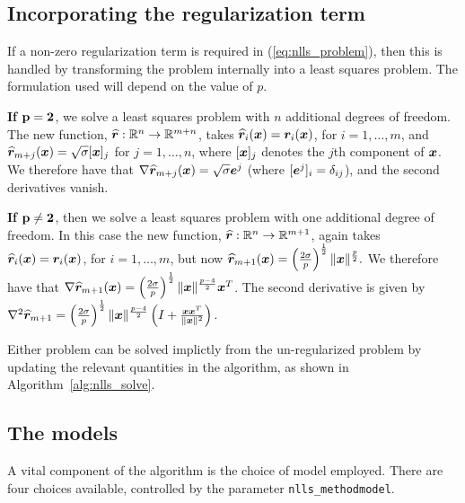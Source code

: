 \subsection{Incorporating the regularization term}
\label{sec:reg_problem}

If a non-zero regularization term is required in (\ref{eq:nlls_problem}), then this is handled by transforming the problem internally into a least squares problem.  The
formulation used will depend on the value of $p$.

{\bf If $\bf p = 2$}, we solve a least squares problem with $n$ additional degrees of freedom.
The new function, $\widehat{{\bm r}} : \mathbb{R}^{n}\rightarrow\mathbb{R}^{m+n}$, takes $\widehat{{\bm r}}_i({\bm x}) = {\bm r}_i({\bm x})$, for $i = 1,\dots, m$, and $\widehat{{\bm r}}_{m+j}({\bm x}) =
\sqrt{\sigma}[{\bm x}]_j$ for $j = 1,\dots, n$, where $[{\bm x}]_j$ denotes the $j$th component of ${\bm x}$.  We therefore have that $\nabla \widehat{{\bm r}}_{m+j}({\bm x}) = \sqrt{\sigma}{\bm e}^j$ (where $[{\bm e}^j]_i = \delta_{ij}$), and the second derivatives vanish.

{\bf If $\bf p \ne 2$}, then we solve a least squares problem
 with one additional degree of freedom.  In this case the new function, $\widehat{{\bm r}} : \mathbb{R}^{n}\rightarrow\mathbb{R}^{m+1}$, again takes $\widehat{{\bm r}}_i({\bm x}) = {\bm r}_i({\bm x})$, for $i = 1,\dots, m$, but now $\widehat{{\bm r}}_{m+1}({\bm x}) = \left(\frac{2\sigma}{p}\right)^{\frac{1}{2}}\|{\bm x}\|^{\frac{p}{2}}.$  We therefore have that
$\nabla \widehat{{\bm r}}_{m+1}({\bm x}) = \left(\frac{2\sigma}{p}\right)^{\frac{1}{2}}\|{\bm x}\|^{\frac{p-4}{2}}{\bm x}^T$.
The second derivative is given by %
\(
\nabla^2\widehat{\vr}_{m+1} =
   \left(\frac{2\sigma}{p}\right)^{\frac{1}{2}}\|\vx\|^{\frac{p-4}{2}}\left(I + \frac{\vx\vx^T}{\|\vx\|^2}\right).%
\)


Either problem can be solved implictly from the un-regularized problem by updating the relevant quantities in the algorithm, as shown in Algorithm~\ref{alg:nlls_solve}.

\subsection{The models}
\label{sec:model_description}

A vital component of the algorithm is the choice of model employed.  There are four choices
available, controlled by the parameter {\tt  nlls\_method\ct model}.

